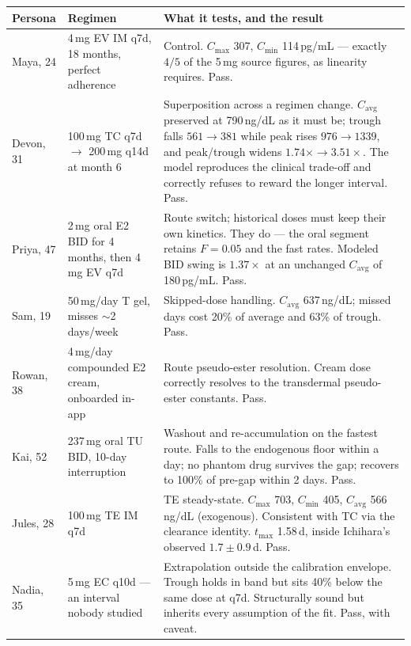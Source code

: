 \documentclass[11pt,a4paper]{article}
\newcommand{\good}[1]{#1}
\begin{document}
\begin{longtable}{@{}p{2.6cm}p{4.5cm}p{7.4cm}@{}}
\toprule
\textbf{Persona} & \textbf{Regimen} & \textbf{What it tests, and the result} \\
\midrule
\endhead
Maya, 24 & 4\,mg EV IM q7d, 18 months, perfect adherence
 & Control. $C_{\max}$ 307, $C_{\min}$ 114\,pg/mL --- exactly $4/5$ of
   the 5\,mg source figures, as linearity requires. \good{Pass.} \\[0.4em]
Devon, 31 & 100\,mg TC q7d $\to$ 200\,mg q14d at month 6
 & Superposition across a regimen change. $C_{\mathrm{avg}}$ preserved
   at 790\,ng/dL as it must be; trough falls $561 \to 381$ while peak
   rises $976 \to 1339$, and peak/trough widens $1.74\times \to
   3.51\times$. The model reproduces the clinical trade-off and
   correctly refuses to reward the longer interval. \good{Pass.} \\[0.4em]
Priya, 47 & 2\,mg oral E2 BID for 4 months, then 4\,mg EV q7d
 & Route switch; historical doses must keep their own kinetics. They
   do --- the oral segment retains $F = 0.05$ and the fast rates.
   Modeled BID swing is $1.37\times$ at an unchanged $C_{\mathrm{avg}}$
   of 180\,pg/mL. \good{Pass.} \\[0.4em]
Sam, 19 & 50\,mg/day T gel, misses $\sim$2 days/week
 & Skipped-dose handling. $C_{\mathrm{avg}}$ 637\,ng/dL; missed days
   cost 20\% of average and 63\% of trough. \good{Pass.} \\[0.4em]
Rowan, 38 & 4\,mg/day compounded E2 cream, onboarded in-app
 & Route pseudo-ester resolution. Cream dose correctly resolves to the
   transdermal pseudo-ester constants. \good{Pass.} \\[0.4em]
Kai, 52 & 237\,mg oral TU BID, 10-day interruption
 & Washout and re-accumulation on the fastest route. Falls to the
   endogenous floor within a day; no phantom drug survives the gap;
   recovers to 100\% of pre-gap within 2 days. \good{Pass.} \\[0.4em]
Jules, 28 & 100\,mg TE IM q7d
 & TE steady-state. $C_{\max}$ 703, $C_{\min}$ 405, $C_{\mathrm{avg}}$
   566\,ng/dL (exogenous). Consistent with TC via the clearance
   identity. $t_{\max}$ 1.58\,d, inside Ichihara's observed $1.7 \pm
   0.9$\,d. \good{Pass.} \\[0.4em]
Nadia, 35 & 5\,mg EC q10d --- an interval nobody studied
 & Extrapolation outside the calibration envelope. Trough holds in
   band but sits 40\% below the same dose at q7d. Structurally sound
   but inherits every assumption of the fit. \good{Pass, with caveat.} \\
\bottomrule
\end{longtable}
\end{document}
